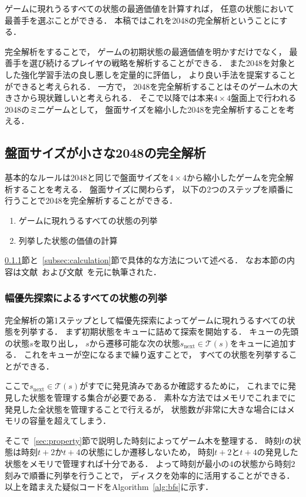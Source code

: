 ゲームに現れうるすべての状態の最適価値を計算すれば， 任意の状態において最善手を選ぶことができる．
本稿ではこれを2048の完全解析ということにする．

完全解析をすることで， ゲームの初期状態の最適価値を明かすだけでなく， 最善手を選び続けるプレイヤの戦略を解析することができる．
また2048を対象とした強化学習手法の良し悪しを定量的に評価し， より良い手法を提案することができると考えられる．
一方で， 2048を完全解析することはそのゲーム木の大きさから現状難しいと考えられる．
そこで以降では本来$4\times4$盤面上で行われる2048のミニゲームとして， 盤面サイズを縮小した2048を完全解析することを考える．

\subsection{盤面サイズが小さな2048の完全解析}
\label{sec:mini2048}
基本的なルールは2048と同じで盤面サイズを$4\times4$から縮小したゲームを完全解析することを考える．
盤面サイズに関わらず， 以下の$2$つのステップを順番に行うことで2048を完全解析することができる．

\begin{enumerate}
    \item ゲームに現れうるすべての状態の列挙
    \item 列挙した状態の価値の計算
\end{enumerate}

\ref{subsec:enumeration}節と~\ref{subsec:calculation}節で具体的な方法について述べる．
なお本節の内容は文献~\cite{3x3_2048}および文献~\cite{4x3_2048}を元に執筆された．

\subsubsection{幅優先探索によるすべての状態の列挙}
\label{subsec:enumeration}
完全解析の第1ステップとして幅優先探索によってゲームに現れうるすべての状態を列挙する．
まず初期状態をキューに詰めて探索を開始する．
キューの先頭の状態$s$を取り出し， $s$から遷移可能な次の状態$s_{\text{next}} \in \mathcal{T}(s)$をキューに追加する．
これをキューが空になるまで繰り返すことで， すべての状態を列挙することができる．

ここで$s_{\text{next}} \in \mathcal{T}(s)$がすでに発見済みであるか確認するために， これまでに発見した状態を管理する集合が必要である．
素朴な方法ではメモリでこれまでに発見した全状態を管理することで行えるが， 状態数が非常に大きな場合にはメモリの容量を超えてしまう．

そこで~\ref{sec:property}節で説明した時刻によってゲーム木を整理する．
時刻$t$の状態は時刻$t+2$か$t+4$の状態にしか遷移しないため， 時刻$t+2$と$t+4$の発見した状態をメモリで管理すれば十分である．
よって時刻が最小の$4$の状態から時刻$2$刻みで順番に列挙を行うことで， ディスクを効率的に活用することができる．
以上を踏まえた疑似コードをAlgorithm~\ref{alg:bfs}に示す．

